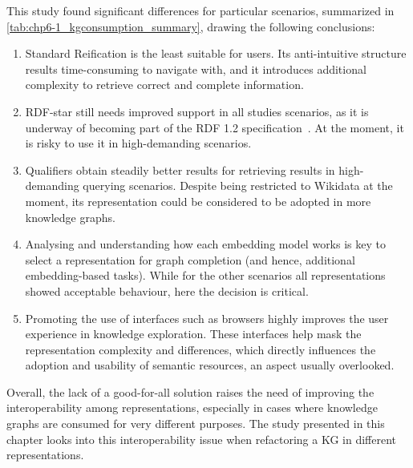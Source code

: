 This study found significant differences for particular scenarios, summarized in \cref{tab:chp6-1_kgconsumption_summary}, drawing the following conclusions: 
\begin{enumerate}
    \item Standard Reification is the least suitable for users. Its anti-intuitive structure results time-consuming to navigate with, and it introduces additional complexity to retrieve correct and complete information.
    \item RDF-star still needs improved support in all studies scenarios, as it is underway of becoming part of the RDF 1.2 specification~\parencite{hartig2023rdf}. At the moment, it is risky to use it in high-demanding scenarios.
    \item Qualifiers obtain steadily better results for retrieving results in high-demanding querying scenarios. Despite being restricted to Wikidata at the moment, its representation could be considered to be adopted in more knowledge graphs.
    \item Analysing and understanding how each embedding model works is key to select a representation for graph completion (and hence, additional embedding-based tasks). While for the other scenarios all representations showed acceptable behaviour, here the decision is critical.
    \item Promoting the use of interfaces such as browsers highly improves the user experience in knowledge exploration. These interfaces help mask the representation complexity and differences, which directly influences the adoption and usability of semantic resources, an aspect usually overlooked.
\end{enumerate}

Overall, the lack of a good-for-all solution raises the need of improving the interoperability among representations, especially in cases where knowledge graphs are consumed for very different purposes. The study presented in this chapter looks into this interoperability issue when refactoring a KG in different representations.

